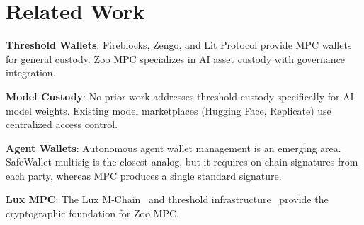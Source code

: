 \section{Related Work}


\textbf{Threshold Wallets}: Fireblocks, Zengo, and Lit Protocol provide MPC wallets for general custody. Zoo MPC specializes in AI asset custody with governance integration.

\textbf{Model Custody}: No prior work addresses threshold custody specifically for AI model weights. Existing model marketplaces (Hugging Face, Replicate) use centralized access control.

\textbf{Agent Wallets}: Autonomous agent wallet management is an emerging area. Safe{Wallet} multisig is the closest analog, but it requires on-chain signatures from each party, whereas MPC produces a single standard signature.

\textbf{Lux MPC}: The Lux M-Chain~\cite{lux-mchain-mpc} and threshold infrastructure~\cite{lux-threshold} provide the cryptographic foundation for Zoo MPC.

